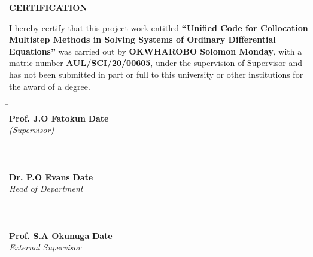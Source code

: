 \documentclass[a4paper, twoside]{report} %
\begin{document}
	\begin{titlepage}
		\begin{center}
			\textbf{\huge CERTIFICATION}
		\end{center}

		\vspace{1cm}

		\noindent
		I hereby certify that this project work entitled \textbf{“Unified Code for Collocation Multistep Methods in Solving Systems of Ordinary Differential Equations”} was carried out by \textbf{OKWHAROBO Solomon Monday}, with a matric number \textbf{AUL/SCI/20/00605}, under the supervision of Supervisor and has not been submitted in part or full to this university or other institutions for the award of a degree.

		\vfill

		\noindent
		\begin{tabbing}
			\hspace{8cm} \= \hspace{8cm} \kill
			\makebox[6cm]{\hrulefill} \> \makebox[6cm]{\hrulefill} \\
			\textbf{Prof. J.O Fatokun} \> \textbf{Date} \\
			\textit{(Supervisor)} \\
			\\
			\\
			\makebox[6cm]{\hrulefill} \> \makebox[6cm]{\hrulefill} \\
			\textbf{Dr. P.O Evans} \> \textbf{Date} \\
			\textit{Head of Department} \\
			\\
			\\
			\makebox[6cm]{\hrulefill} \> \makebox[6cm]{\hrulefill} \\
			\textbf{Prof. S.A Okunuga} \> \textbf{Date} \\
			\textit{External Supervisor} \\
		\end{tabbing}
	\end{titlepage}
\end{document}
